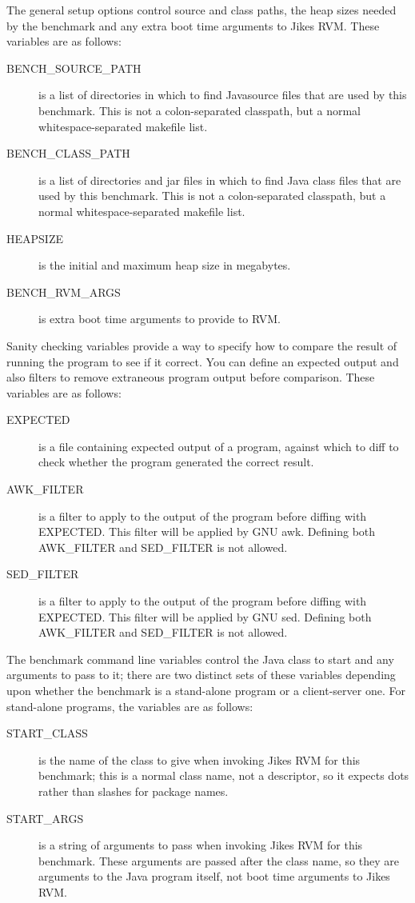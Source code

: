 \begin{description}
 The general setup options control source and class paths, the heap
sizes needed by the benchmark and any extra boot time arguments to
Jikes RVM.  These variables are as follows:
\begin{description}
\item[BENCH\_SOURCE\_PATH] is a list of directories in which to find
Java\trademark source files that are used by this benchmark.  This is not a
colon-separated classpath, but a normal whitespace-separated makefile
list.  
\item[BENCH\_CLASS\_PATH] is a list of directories and jar files in
which to find Java class files that are used by this benchmark.  This
is not a colon-separated classpath, but a normal whitespace-separated
makefile list.  
\item[HEAPSIZE] is the initial and maximum heap size in megabytes.
\item[BENCH\_RVM\_ARGS] is extra boot time arguments to provide to
RVM. 
\end{description}

 Sanity checking variables provide a way to specify how to compare the
result of running the program to see if it correct.  You can define an
expected output and also filters to remove extraneous program output
before comparison.  These variables are as follows:
\begin{description}
\item[EXPECTED] is a file containing expected output of a program,
against which to diff to check whether the program generated the
correct result.
\item[AWK\_FILTER] is a filter to apply to the output of the program
before diffing with EXPECTED.  This filter will be applied by GNU
awk. Defining both AWK\_FILTER and SED\_FILTER is not
allowed. 
\item[SED\_FILTER] is a filter to apply to the output of the program
before diffing with EXPECTED.  This filter will be applied by GNU sed.
Defining both AWK\_FILTER and SED\_FILTER is not allowed. 
\end{description}

 The benchmark command line variables control the Java class to start
and any arguments to pass to it; there are two distinct sets of these
variables depending upon whether the benchmark is a stand-alone program
or a client-server one.  For stand-alone programs, the variables are as
follows: 
\begin{description}
\item[START\_CLASS] is the name of the class to give when invoking
Jikes RVM
for this benchmark; this is a normal class name, not a descriptor, so
it expects dots rather than slashes for package names.
\item[START\_ARGS] is a string of arguments to pass when invoking
Jikes RVM
for this benchmark.  These arguments are passed after the class name,
so they are arguments to the Java program itself, not boot time
arguments to Jikes RVM.
\end{description}


\end{description}
